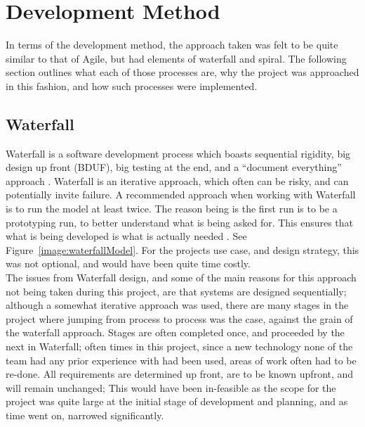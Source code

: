 \section{Development Method}
In terms of the development method, the approach taken was felt to be quite similar to that of Agile, but had elements of waterfall and spiral. The following section outlines what each of those processes are, why the project was approached in this fashion, and how such processes were implemented.

\subsection{Waterfall}
Waterfall is a software development process which boasts sequential rigidity, big design up front (BDUF), big testing at the end, and a “document everything” approach \cite{palmquist2013parallel}. Waterfall is an iterative approach, which often can be risky, and can potentially invite failure. A recommended approach when working with Waterfall is to run the model at least twice. The reason being is the first run is to be a prototyping run, to better understand what is being asked for. This ensures that what is being developed is what is actually needed  \cite{palmquist2013parallel}. See Figure~\ref{image:waterfallModel}. For the projects use case, and design strategy, this was not optional, and would have been quite time costly.
\\ The issues from Waterfall design, and some of the main reasons for this approach not being taken during this project, are that systems are designed sequentially; although a somewhat iterative approach was used, there are many stages in the project where jumping from process to process was the case, against the grain of the waterfall approach. Stages are often completed once, and proceeded by the next in Waterfall; often times in this project, since a new technology none of the team had any prior experience with had been used, areas of work often had to be re-done. All requirements are determined up front, are to be known upfront, and will remain unchanged; This would have been in-feasible as the scope for the project was quite large at the initial stage of development and planning, and as time went on, narrowed significantly. 

